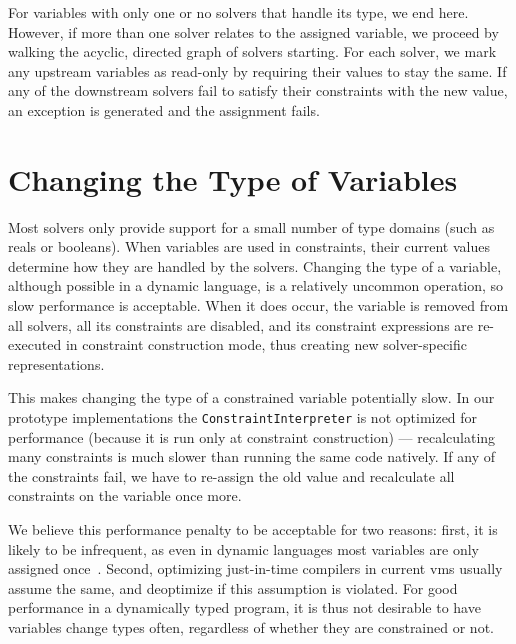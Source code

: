 For variables with only one or no solvers that handle its type, we end
here. However, if more than one solver relates to the assigned variable, we
proceed by walking the acyclic, directed graph of solvers starting. For each
solver, we mark any upstream variables as read-only by requiring their values to
stay the same. If any of the downstream solvers fail to satisfy their
constraints with the new value, an exception is generated and the assignment
fails.

\section{Changing the Type of Variables}
Most solvers only provide support for a small number of type domains (such as
reals or booleans).  When variables are used in constraints, their current
values determine how they are handled by the solvers.  Changing the type of a
variable, although possible in a dynamic language, is a relatively uncommon
operation, so slow performance is acceptable.  When it does occur, the variable
is removed from all solvers, all its constraints are disabled, and its
constraint expressions are re-executed in constraint construction mode, thus
creating new solver-specific representations.

This makes changing the type of a constrained variable potentially slow. In our
prototype implementations the \lstinline{ConstraintInterpreter} is not optimized
for performance (because it is run only at constraint construction) ---
recalculating many constraints is much slower than running the same code
natively. If any of the constraints fail, we have to re-assign the old value and
recalculate all constraints on the variable once more.

We believe this performance penalty to be acceptable for two reasons: first, it
is likely to be infrequent, as even in dynamic languages most variables are only
assigned once~\cite{chambers1989efficient}. Second, optimizing just-in-time
compilers in current \acp{vm} usually assume the same, and deoptimize
if this assumption is violated. For good performance in a dynamically typed program, it is
thus not desirable to have variables change types often, regardless of whether
they are constrained or not.

